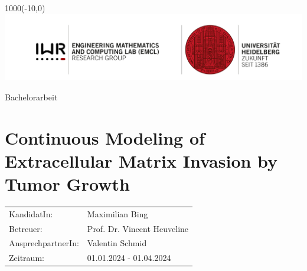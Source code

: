 \documentclass[12pt]{article}
\begin{document}
	\begin{textblock}{1000}(-10,0)
		\includegraphics{heading.png}
	\end{textblock}
\noindent Bachelorarbeit
\section*{Continuous Modeling of Extracellular Matrix Invasion by \\ Tumor Growth}
\begin{tabular}{l l}
	KandidatIn: & Maximilian Bing\\
	Betreuer: & Prof. Dr. Vincent Heuveline \\
	AnsprechpartnerIn: & Valentin Schmid \\
	Zeitraum: & 01.01.2024 - 01.04.2024
\end{tabular}
\newline
\end{document}
